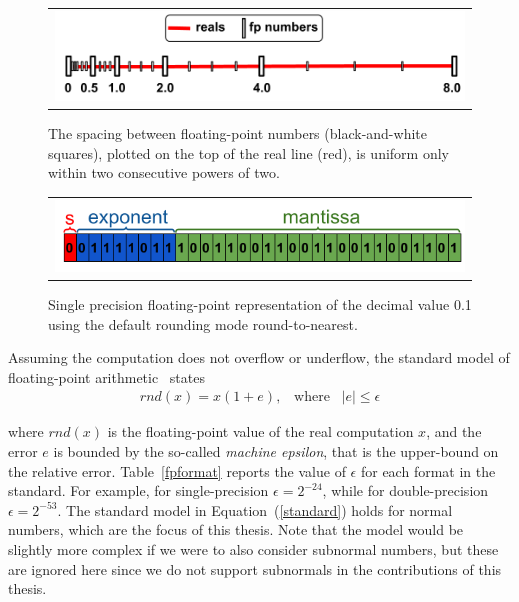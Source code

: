 %
\begin{figure}[tb!]
	\centering
	\begin{tabular}{l}
		\includegraphics[width=1.0\textwidth]{pic/fpnumbers.png}
	\end{tabular}
	\caption{The spacing between floating-point numbers (black-and-white squares), plotted on the top of the real line (red), is uniform only within two consecutive powers of two.}
	\label{fig:line}
\end{figure}
%
\begin{figure}[tb!]
	\centering
	\begin{tabular}{l}
		\includegraphics[width=1.0\textwidth]{pic/examplenumber.png}
	\end{tabular}
	\caption{Single precision floating-point representation of the decimal value 0.1 using the default rounding mode round-to-nearest.}
	\label{fig:zeropointone}
\end{figure}
%

Assuming the computation does not overflow or underflow, the standard model of floating-point arithmetic~\cite{every} states
%
\begin{align}
rnd(x)=x(1+e),\;\;\;\text{where}\;\;\;|e|\leq\epsilon
\label{standard}
\end{align}
%

where $rnd(x)$ is the floating-point value of the real computation $x$, and the error $e$ is bounded by the so-called \emph{machine epsilon}, that is the upper-bound on the relative error.
%
Table~\ref{fpformat} reports the value of $\epsilon$ for each format in the standard.
%
For example, for single-precision $\epsilon=2^{-24}$, while for double-precision $\epsilon=2^{-53}$.
%
The standard model in Equation~(\ref{standard}) holds for normal numbers, which are the focus of this thesis.
%
Note that the model would be slightly more complex if we were to also consider subnormal numbers, but these are ignored here since we do not support subnormals in the contributions of this thesis.
%

